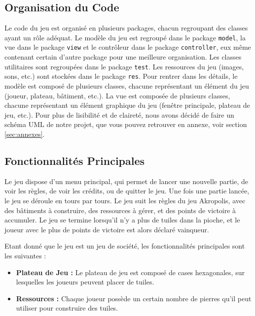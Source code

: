 \documentclass{article}
\begin{document}
    \subsection{Organisation du Code}\label{subsec:organisation-du-code}

    Le code du jeu est organisé en plusieurs packages, chacun regroupant des classes ayant un rôle adéquat.
    Le modèle du jeu est regroupé dans le package \texttt{model}, la vue dans le package \texttt{view} et le contrôleur dans le package \texttt{controller}, eux même contenant certain d'autre package pour une meilleure organisation.
    Les classes utilitaires sont regroupées dans le package \texttt{test}.
    Les ressources du jeu (images, sons, etc.) sont stockées dans le package \texttt{res}.
    Pour rentrer dans les détails, le modèle est composé de plusieurs classes, chacune représentant un élément du jeu (joueur, plateau, bâtiment, etc.).
    La vue est composée de plusieurs classes, chacune représentant un élément graphique du jeu (fenêtre principale, plateau de jeu, etc.).
    Pour plus de lisibilité et de claireté, nous avons décidé de faire un schéma UML de notre projet, que vous pouvez retrouver en annexe, voir section \ref{sec:annexes}.

    \subsection{Fonctionnalités Principales}\label{subsec:fonctionnalites-principales}

    Le jeu dispose d'un menu principal, qui permet de lancer une nouvelle partie, de voir les règles, de voir les crédits, ou de quitter le jeu.
    Une fois une partie lancée, le jeu se déroule en tours par tours.
    Le jeu suit les règles du jeu Akropolis, avec des bâtiments à construire, des ressources à gérer, et des points de victoire à accumuler.
    Le jeu se termine lorsqu'il n'y a plus de tuiles dans la pioche, et le joueur avec le plus de points de victoire est alors déclaré vainqueur.

    Etant donné que le jeu est un jeu de société, les fonctionnalités principales sont les suivantes :
    \begin{itemize}
        \item \textbf{Plateau de Jeu :} Le plateau de jeu est composé de cases hexagonales, sur lesquelles les joueurs peuvent placer de tuiles.
        \item \textbf{Ressources :} Chaque joueur possède un certain nombre de pierres qu'il peut utiliser pour construire des tuiles. \end{itemize}
\end{document}
